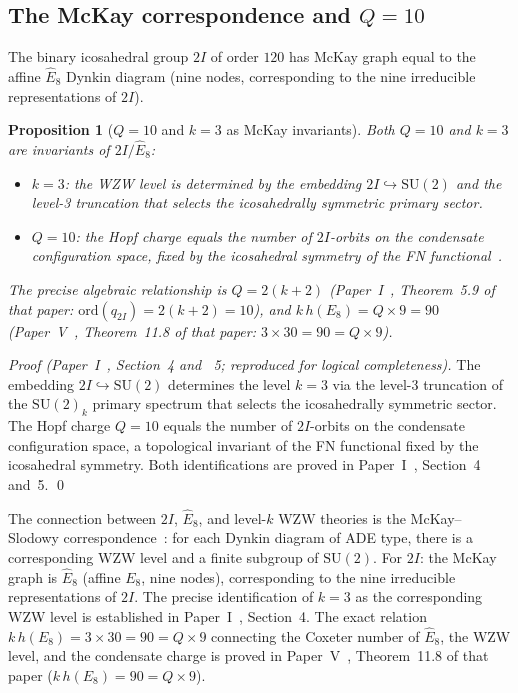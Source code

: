 \documentclass[11pt,a4paper]{article}
\newtheorem{proposition}[theorem]{Proposition}
\theoremstyle{definition}
\theoremstyle{remark}
\newcommand{\twoI}{2I}
\newcommand{\Ehat}{\hat{E}_8}
\begin{document}
\subsection{The McKay correspondence and $Q=10$}

The binary icosahedral group $\twoI$ of order $120$ has McKay graph
equal to the affine $\Ehat$ Dynkin diagram (nine nodes,
corresponding to the nine irreducible representations of $\twoI$).

\begin{proposition}[$Q=10$ and $k=3$ as McKay invariants]
\label{F:prop:mckay}
Both $Q=10$ and $k=3$ are invariants of $\twoI/\Ehat$:
\begin{itemize}
  \item $k=3$: the WZW level is determined by the embedding
    $\twoI \hookrightarrow \mathrm{SU}(2)$ and the level-3 truncation
    that selects the icosahedrally symmetric primary sector.
  \item $Q=10$: the Hopf charge equals the number of $\twoI$-orbits
    on the condensate configuration space, fixed by the icosahedral
    symmetry of the FN functional~\cite{Paper1}.
\end{itemize}
The precise algebraic relationship is $Q = 2(k+2)$
(Paper~I~\cite{Paper1}, Theorem~5.9 of that paper: $\mathrm{ord}(q_{2I})=2(k+2)=10$),
and $k\,h(E_8) = Q\times 9 = 90$
(Paper~V~\cite{Paper5}, Theorem~11.8 of that paper: $3\times30=90=Q\times9$).
\end{proposition}

\begin{proof}[Proof (Paper~I~\cite{Paper1}, Section~4 and ~5; reproduced for logical completeness)]
The embedding $\twoI\hookrightarrow\mathrm{SU}(2)$ determines the level $k=3$
via the level-3 truncation of the $\mathrm{SU}(2)_k$ primary spectrum that
selects the icosahedrally symmetric sector.
The Hopf charge $Q=10$ equals the number of $\twoI$-orbits on the condensate
configuration space, a topological invariant of the FN functional fixed by
the icosahedral symmetry.
Both identifications are proved in Paper~I~\cite{Paper1}, Section~4 and~5.
\qed
\end{proof}

The connection between $\twoI$, $\Ehat$, and level-$k$ WZW theories
is the McKay--Slodowy correspondence~\cite{McKay1980}: for each Dynkin
diagram of ADE type, there is a corresponding WZW level and a finite
subgroup of $\mathrm{SU}(2)$.
For $\twoI$: the McKay graph is $\Ehat$ (affine $E_8$, nine nodes),
corresponding to the nine irreducible representations of $\twoI$.
The precise identification of $k=3$ as the corresponding WZW level
is established in Paper~I~\cite{Paper1}, Section~4.
The exact relation $k\,h(E_8) = 3\times30 = 90 = Q\times9$
connecting the Coxeter number of $\Ehat$, the WZW level, and the
condensate charge is proved in Paper~V~\cite{Paper5},
Theorem~11.8 of that paper ($k\,h(E_8) = 90 = Q\times9$).
\end{document}
